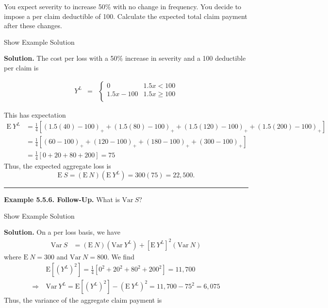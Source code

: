 \documentclass[]{book}
\theoremstyle{definition}
\theoremstyle{definition}
\theoremstyle{definition}
\theoremstyle{remark}
\begin{document}
You expect severity to increase 50\% with no change in frequency. You
decide to impose a per claim deductible of 100. Calculate the expected
total claim payment after these changes.

Show Example Solution

\hypertarget{toggleExampleAggLoss.5.5}{}
\textbf{Solution.} The cost per loss with a 50\% increase in severity
and a 100 deductible per claim is

\begin{eqnarray*}
Y^L &=&
\left\{
\begin{array}{cc}
0 & 1.5x<100 \\
1.5x-100 & 1.5x\ge 100\\
\end{array}
\right.
\end{eqnarray*}

This has expectation \[\begin{aligned}
\mathrm{E~}Y^L &= \frac{1}{4} \left[ \left(1.5(40)-100\right)_+ +
\left(1.5(80)-100\right)_+ + \left(1.5(120)-100\right)_+ +
\left(1.5(200)-100\right)_+ \right]  \\
&= \frac{1}{4}\left[ (60-100)_+ + (120-100)_+ + (180-100)_+ + (300-100)_+\right] \\
&= \frac{1}{4}\left[ 0 + 20 + 80 + 200 \right] = 75
\end{aligned}\] Thus, the expected aggregate loss is
\[\mathrm{E~}S=(\mathrm{E~}N) \left( \mathrm{E~}Y^L \right)= 300 (75) = 22,500
.\]

\begin{center}\rule{0.5\linewidth}{\linethickness}\end{center}

\textbf{Example 5.5.6. Follow-Up.} What is \(\mathrm{Var~}S\)?

Show Example Solution

\hypertarget{toggleExampleAggLoss.5.6}{}
\textbf{Solution.} On a per loss basis, we have \[\begin{aligned}
\mathrm{Var~}S &= \left(\mathrm{E~}N \right) \left( \mathrm{Var~} Y^L \right) + \left[ \mathrm{E~} Y^L \right]^2 \left(\mathrm{Var~} N \right)
\end{aligned}\] where \(\mathrm{E~}N = 300\) and
\(\mathrm{Var~} N = 800\). We find \[\begin{aligned}
&\mathrm{E} \left[ (Y^L)^2 \right] = \frac{1}{4} \left[ 0^2 + 20^2 + 80^2 + 200^2 \right] = 11,700 \\
\Rightarrow \ & \mathrm{Var~} Y^L = \mathrm{E} \left[ (Y^L)^2 \right] - \left( \mathrm{E~}Y^L \right)^2 = 11,700 - 75^2 = 6,075
\end{aligned}\] Thus, the variance of the aggregate claim payment is
\end{document}
